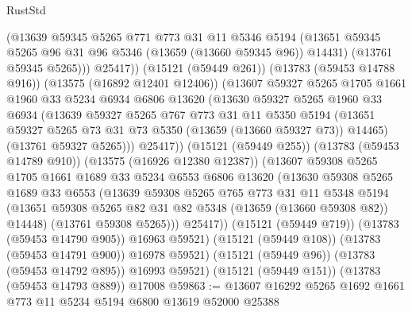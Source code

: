 \begin{lexlean}{RustStd}
\begin{coremodule}
                    (@13639
                      @59345
                      @5265
                      @771
                      @773
                      @31
                      @11
                      @5346
                      @5194
                      (@13651 @59345 @5265 @96 @31 @96 @5346 (@13659 (@13660 @59345 @96)) @14431)
                      (@13761 @59345 @5265)))
                  @25417))
              (@15121 (@59449 @261))
              (@13783 (@59453 @14788 @916))
              (@13575 (@16892 @12401 @12406))
              (@13607
                @59327
                @5265
                @1705
                @1661
                @1960
                @33
                @5234
                @6934
                @6806
                @13620
                (@13630
                  @59327
                  @5265
                  @1960
                  @33
                  @6934
                  (@13639
                    @59327
                    @5265
                    @767
                    @773
                    @31
                    @11
                    @5350
                    @5194
                    (@13651 @59327 @5265 @73 @31 @73 @5350 (@13659 (@13660 @59327 @73)) @14465)
                    (@13761 @59327 @5265)))
                @25417))
            (@15121 (@59449 @255))
            (@13783 (@59453 @14789 @910))
            (@13575 (@16926 @12380 @12387))
            (@13607
              @59308
              @5265
              @1705
              @1661
              @1689
              @33
              @5234
              @6553
              @6806
              @13620
              (@13630
                @59308
                @5265
                @1689
                @33
                @6553
                (@13639
                  @59308
                  @5265
                  @765
                  @773
                  @31
                  @11
                  @5348
                  @5194
                  (@13651 @59308 @5265 @82 @31 @82 @5348 (@13659 (@13660 @59308 @82)) @14448)
                  (@13761 @59308 @5265)))
              @25417))
          (@15121 (@59449 @719))
          (@13783 (@59453 @14790 @905))
          @16963
          @59521)
        (@15121 (@59449 @108))
        (@13783 (@59453 @14791 @900))
        @16978
        @59521)
      (@15121 (@59449 @96))
      (@13783 (@59453 @14792 @895))
      @16993
      @59521)
    (@15121 (@59449 @151))
    (@13783 (@59453 @14793 @889))
    @17008
@59863 := @13607 @16292 @5265 @1692 @1661 @773 @11 @5234 @5194 @6800 @13619 @52000 @25388

\end{coremodule}
\end{lexlean}
